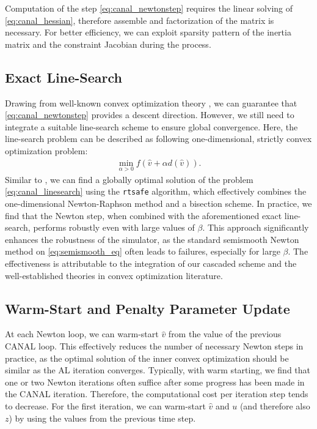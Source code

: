 \documentclass[lettersize,journal]{IEEEtran}
\begin{document}
Computation of the step \eqref{eq:canal_newtonstep} requires the linear solving of \eqref{eq:canal_hessian}, therefore assemble and factorization of the matrix is necessary.
For better efficiency, we can exploit sparsity pattern of the inertia matrix and the constraint Jacobian during the process. 


\subsection{Exact Line-Search}

Drawing from well-known convex optimization theory \cite{nocedal1999numerical}, we can guarantee that \eqref{eq:canal_newtonstep} provides a descent direction. 
However, we still need to integrate a suitable line-search scheme to ensure global convergence. 
Here, the line-search problem can be described as following one-dimensional, strictly convex optimization problem:
\begin{align} \label{eq:canal_linesearch}
    \min_{\alpha > 0} f(\hat{v}+\alpha d(\hat{v})).
\end{align}   
Similar to \cite{castro2022unconstrained}, we can find a globally optimal solution of the problem \eqref{eq:canal_linesearch} using the \texttt{rtsafe} algorithm, which effectively combines the one-dimensional Newton-Raphson method and a bisection scheme.
In practice, we find that the Newton step, when combined with the aforementioned exact line-search, performs robustly even with large values of $\beta$. 
This approach significantly enhances the robustness of the simulator, as the standard semismooth Newton method on \eqref{eq:semismooth_eq} often leads to failures, especially for large $\beta$. The effectiveness is attributable to the integration of our cascaded scheme and the well-established theories in convex optimization literature.


\subsection{Warm-Start and Penalty Parameter Update} \label{subsec:canal_warmstart_penalty}

At each Newton loop, we can warm-start $\hat{v}$ from the value of the previous CANAL loop. This effectively reduces the number of necessary Newton steps in practice, as the optimal solution of the inner convex optimization should be similar as the AL iteration converges. Typically, with warm starting, we find that one or two Newton iterations often suffice after some progress has been made in the CANAL iteration.
Therefore, the computational cost per iteration step tends to decrease. 
For the first iteration, we can warm-start $\hat{v}$ and $u$ (and therefore also $z$) by using the values from the previous time step. 
\end{document}
